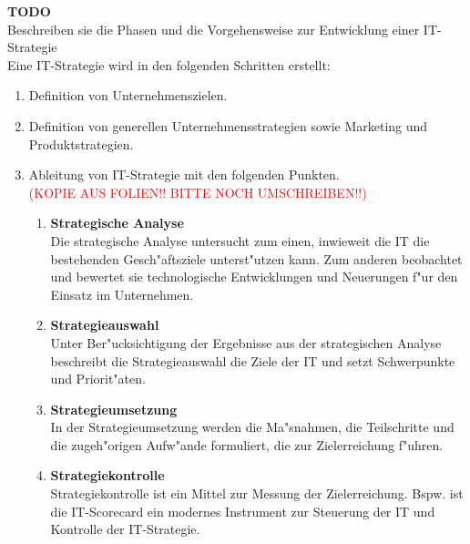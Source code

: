\textbf{TODO}\\
Beschreiben sie die Phasen und die Vorgehensweise zur Entwicklung einer IT-Strategie\\

Eine IT-Strategie wird in den folgenden Schritten erstellt:
\begin{enumerate}

	\item Definition von Unternehmenszielen.
	
	\item Definition von generellen Unternehmensstrategien sowie Marketing und Produktstrategien.
	
	\item Ableitung von IT-Strategie mit den folgenden Punkten.\\\textcolor{red}{(KOPIE AUS FOLIEN!! BITTE NOCH UMSCHREIBEN!!)}
	
\begin{enumerate}

		\item \textbf{Strategische Analyse}\\
Die strategische Analyse untersucht zum einen, inwieweit die IT die bestehenden Gesch"aftsziele unterst"utzen kann. Zum anderen beobachtet und bewertet sie technologische Entwicklungen und Neuerungen f"ur den Einsatz im Unternehmen.
		
		\item \textbf{Strategieauswahl}\\
Unter Ber"ucksichtigung der Ergebnisse aus der strategischen Analyse beschreibt die Strategieauswahl die Ziele der IT und setzt Schwerpunkte und Priorit"aten.
		
		\item \textbf{Strategieumsetzung}\\
In der Strategieumsetzung werden die Ma"snahmen, die Teilschritte und die zugeh"origen Aufw"ande formuliert, die zur Zielerreichung f"uhren.

		\item \textbf{Strategiekontrolle}\\
Strategiekontrolle ist ein Mittel zur Messung der Zielerreichung. Bspw. ist die IT-Scorecard ein modernes Instrument zur Steuerung der IT und Kontrolle der IT-Strategie.

\end{enumerate}
	
\end{enumerate}
